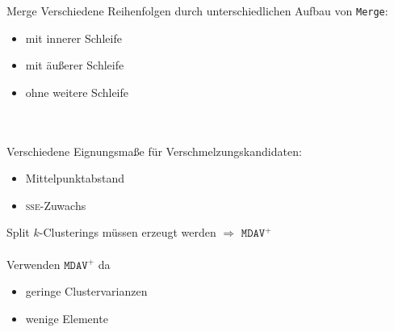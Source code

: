 \documentclass[10pt,table]{beamer}
\newcommand{\sse}{\textsc{sse}\xspace}
\newcommand{\mdav}{\texttt{MDAV}\xspace}
\newcommand{\mdavplus}{$\mdav^+$\xspace}
\newcommand{\merge}{\texttt{Merge}\xspace}
\begin{document}
\begin{frame}{Merge}
    Verschiedene Reihenfolgen durch unterschiedlichen Aufbau von \merge:
    \begin{itemize}
        \item mit innerer Schleife
        \item mit äußerer Schleife
        \item ohne weitere Schleife
    \end{itemize}
    ~\\~\\
    Verschiedene Eignungsmaße für Verschmelzungskandidaten:
    \begin{itemize}
        \item Mittelpunktabstand
        \item \sse-Zuwachs
    \end{itemize}
\end{frame}

\begin{frame}{Split}
    $k$-Clusterings müssen erzeugt werden $\Rightarrow$ \mdavplus
    \\~\\
    Verwenden \mdavplus da
    \begin{itemize}
        \item geringe Clustervarianzen
        \item wenige Elemente
    \end{itemize}
\end{frame}
\end{document}
